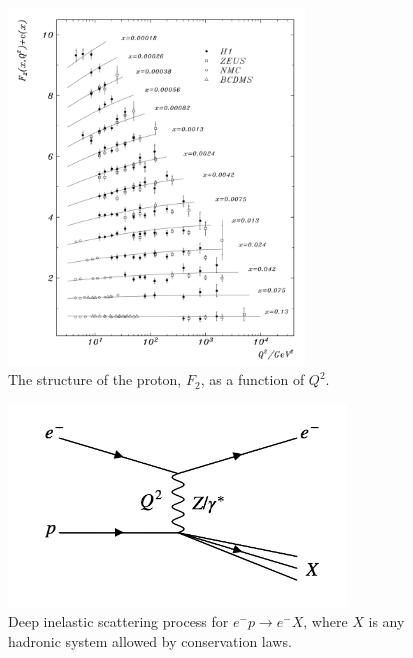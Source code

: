\begin{figure}[!htb]
  \begin{center}
    \includegraphics[width=0.7\textwidth]{images/chapter_3/F2.pdf}
    \caption[The structure of the proton]{The structure of the proton, $F_2$, as a function of $Q^2$. \cite{F2}}
    \label{fig:ch3_F2}
  \end{center}
\end{figure}

\begin{figure}[!htb]
  \begin{center}
    \includegraphics[width=0.8\textwidth]{images/web_feynman/image_11.png}
    \caption[Deep inelastic scattering process]{Deep inelastic scattering process for $e^-p\to e^-X$, where $X$ is any hadronic system allowed by conservation laws.}
    \label{fig:ch3_EPToEHad}
  \end{center}
\end{figure}

